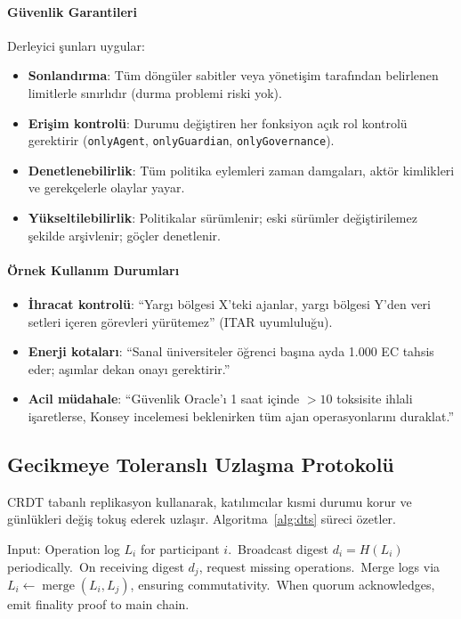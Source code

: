 \documentclass[11pt]{article}
\begin{document}
\paragraph{Güvenlik Garantileri} Derleyici şunları uygular:
\begin{itemize}[noitemsep]
  \item \textbf{Sonlandırma}: Tüm döngüler sabitler veya yönetişim tarafından belirlenen limitlerle sınırlıdır (durma problemi riski yok).
  \item \textbf{Erişim kontrolü}: Durumu değiştiren her fonksiyon açık rol kontrolü gerektirir (\texttt{onlyAgent}, \texttt{onlyGuardian}, \texttt{onlyGovernance}).
  \item \textbf{Denetlenebilirlik}: Tüm politika eylemleri zaman damgaları, aktör kimlikleri ve gerekçelerle olaylar yayar.
  \item \textbf{Yükseltilebilirlik}: Politikalar sürümlenir; eski sürümler değiştirilemez şekilde arşivlenir; göçler denetlenir.
\end{itemize}

\paragraph{Örnek Kullanım Durumları}
\begin{itemize}[noitemsep]
  \item \textbf{İhracat kontrolü}: ``Yargı bölgesi X'teki ajanlar, yargı bölgesi Y'den veri setleri içeren görevleri yürütemez'' (ITAR uyumluluğu).
  \item \textbf{Enerji kotaları}: ``Sanal üniversiteler öğrenci başına ayda 1.000 EC tahsis eder; aşımlar dekan onayı gerektirir.''
  \item \textbf{Acil müdahale}: ``Güvenlik Oracle'ı 1 saat içinde $>10$ toksisite ihlali işaretlerse, Konsey incelemesi beklenirken tüm ajan operasyonlarını duraklat.''
\end{itemize}

\subsection{Gecikmeye Toleranslı Uzlaşma Protokolü}
CRDT tabanlı replikasyon kullanarak, katılımcılar kısmi durumu korur ve günlükleri değiş tokuş ederek uzlaşır. Algoritma~\ref{alg:dts} süreci özetler.

\begin{algorithm}[H]
  \caption{Delay-Tolerant Settlement (DTS)}
  \label{alg:dts}
  \begin{algorithmic}[1]
    \STATE Input: Operation log $L_i$ for participant $i$.\
    \STATE Broadcast digest $d_i = H(L_i)$ periodically.\
    \STATE On receiving digest $d_j$, request missing operations.\
    \STATE Merge logs via $L_i \leftarrow \operatorname{merge}(L_i, L_j)$, ensuring commutativity.\
    \STATE When quorum acknowledges, emit finality proof to main chain.\
  \end{algorithmic}
\end{algorithm}
\end{document}
